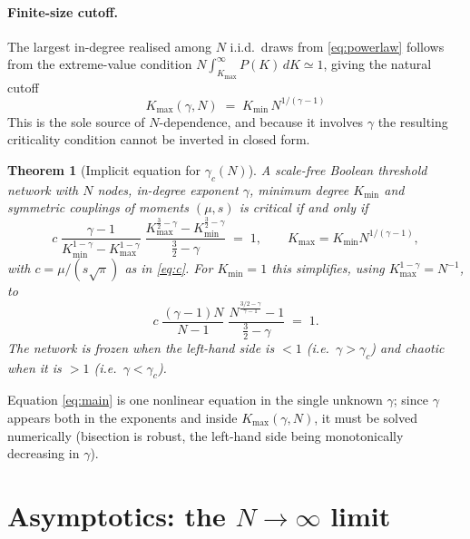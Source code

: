 \documentclass[11pt]{article}
\newtheorem{theorem}{Theorem}
\theoremstyle{remark}
\newcommand{\Kmin}{K_{\mathrm{min}}}
\newcommand{\Kmax}{K_{\mathrm{max}}}
\begin{document}
\paragraph{Finite-size cutoff.} The largest in-degree realised among $N$ i.i.d.\
draws from \eqref{eq:powerlaw} follows from the extreme-value condition
$N\int_{\Kmax}^{\infty}P(K)\,dK\simeq1$, giving the natural cutoff
\begin{equation}
  \boxed{\;\Kmax(\gamma,N)\;=\;\Kmin\,N^{1/(\gamma-1)}\;}
  \label{eq:cutoff}
\end{equation}
This is the sole source of $N$-dependence, and because it involves $\gamma$ the
resulting criticality condition cannot be inverted in closed form.

\begin{theorem}[Implicit equation for $\gamma_c(N)$]
\label{thm:main}
A scale-free Boolean threshold network with $N$ nodes, in-degree exponent
$\gamma$, minimum degree $\Kmin$ and symmetric couplings of moments $(\mu,s)$ is
critical if and only if
\begin{equation}
  c\;\frac{\gamma-1}{\Kmin^{1-\gamma}-\Kmax^{1-\gamma}}\;
  \frac{\Kmax^{\frac32-\gamma}-\Kmin^{\frac32-\gamma}}{\tfrac32-\gamma}
  \;=\;1,
  \qquad
  \Kmax=\Kmin N^{1/(\gamma-1)},
  \label{eq:main}
\end{equation}
with $c=\mu/(s\sqrt\pi)$ as in \eqref{eq:c}. For $\Kmin=1$ this simplifies,
using $\Kmax^{1-\gamma}=N^{-1}$, to
\begin{equation}
  c\;\frac{(\gamma-1)N}{N-1}\;
  \frac{N^{\frac{3/2-\gamma}{\gamma-1}}-1}{\tfrac32-\gamma}\;=\;1 .
  \label{eq:main1}
\end{equation}
The network is frozen when the left-hand side is $<1$ (i.e.\ $\gamma>\gamma_c$)
and chaotic when it is $>1$ (i.e.\ $\gamma<\gamma_c$).
\end{theorem}

Equation \eqref{eq:main} is one nonlinear equation in the single unknown
$\gamma$; since $\gamma$ appears both in the exponents and inside
$\Kmax(\gamma,N)$, it must be solved numerically (bisection is robust, the
left-hand side being monotonically decreasing in $\gamma$).

\section{Asymptotics: the $N\to\infty$ limit}
\end{document}
